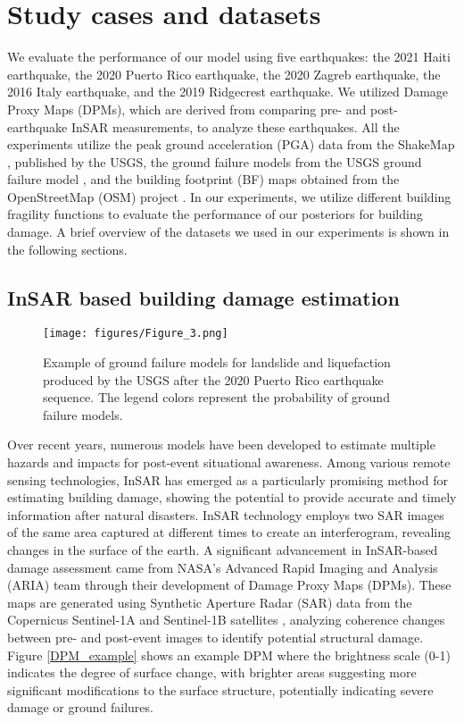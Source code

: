 \documentclass[review]{elsarticle}
\begin{document}
\section{Study cases and datasets}

We evaluate the performance of our model using five earthquakes: the 2021 Haiti earthquake, the 2020 Puerto Rico earthquake, the 2020 Zagreb earthquake, the 2016 Italy earthquake, and the 2019 Ridgecrest earthquake. We utilized Damage Proxy Maps (DPMs), which are derived from comparing pre- and post-earthquake InSAR measurements, to analyze these earthquakes. All the experiments utilize the peak ground acceleration (PGA) data from the ShakeMap \cite{worden2020shakemap}, published by the USGS, the ground failure models from the USGS ground failure model \cite{zhu2017updated,nowicki2018global}, and the building footprint (BF) maps obtained from the OpenStreetMap (OSM) project \cite{OpenStreetMap}. In our experiments, we utilize different building fragility functions \cite{fema2003hazus, wald2010pager} to evaluate the performance of our posteriors for building damage. A brief overview of the datasets we used in our experiments is shown in the following sections.







\subsection{InSAR based building damage estimation}

\begin{figure}[t]
    \centering
\texttt{[image: figures/Figure\_3.png]}
    \caption{Example of ground failure models for landslide and liquefaction produced by the USGS after the 2020 Puerto Rico earthquake sequence. The legend colors represent the probability of ground failure models.}
    \label{USGS_GF}
\end{figure}

Over recent years, numerous models have been developed to estimate multiple hazards and impacts for post-event situational awareness. Among various remote sensing technologies, InSAR has emerged as a particularly promising method for estimating building damage, showing the potential to provide accurate and timely information after natural disasters. InSAR technology employs two SAR images of the same area captured at different times to create an interferogram, revealing changes in the surface of the earth. A significant advancement in InSAR-based damage assessment came from NASA's Advanced Rapid Imaging and Analysis (ARIA) team through their development of Damage Proxy Maps (DPMs). These maps are generated using Synthetic Aperture Radar (SAR) data from the Copernicus Sentinel-1A and Sentinel-1B satellites \cite{dpm1}, analyzing coherence changes between pre- and post-event images to identify potential structural damage. Figure \ref{DPM_example} shows an example DPM where the brightness scale (0-1) indicates the degree of surface change, with brighter areas suggesting more significant modifications to the surface structure, potentially indicating severe damage or ground failures.
\end{document}
